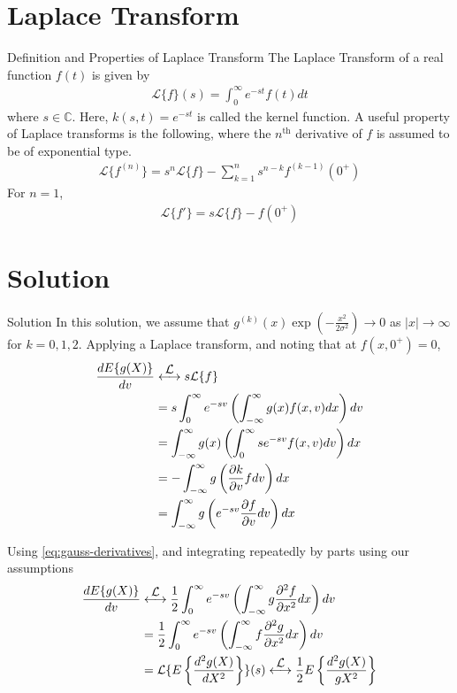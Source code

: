 \documentclass{beamer}
\newcommand\laplace{\ensuremath{\stackrel{\mathclap{\mbox{$\mathcal{L}$}}}{\longleftrightarrow}}}
\begin{document}
\section{Laplace Transform}
\begin{frame}{Definition and Properties of Laplace Transform}
	The Laplace Transform of a real function $f(t)$ is given by
	\begin{align}
		\mathcal{L}\{f\}(s) = \int_{0}^{\infty}e^{-st}f(t)dt  
		\label{eq:lap}
	\end{align}
	where $s \in \mathbb{C}$. Here, $k(s, t) = e^{-st}$ is called the kernel function. A useful property of Laplace transforms is the following, where the $n^{\text{th}}$ derivative of $f$ is assumed to be of exponential type.
	\begin{align}
		\mathcal{L}\{f^{(n)}\} = s^{n}\mathcal{L}\{f\} - \sum_{k = 1}^{n}s^{n - k}f^{(k - 1)}(0^+)
		\label{eq:lap-diff}
	\end{align}
	For $n = 1$,
	\begin{align}
		\mathcal{L}\{f'\} = s\mathcal{L}\{f\} - f(0^+)
		\label{eq:lap-diff-one}
	\end{align}
\end{frame}

\section{Solution}
\begin{frame}{Solution}
	In this solution, we assume that $g^{(k)}(x)\exp{(-\frac{x^2}{2\sigma^2})} \to 0$ as $|x| \to \infty$ for $k = 0, 1, 2$. Applying a Laplace transform, and noting that at $f(x, 0^+) = 0$,
	\begin{align}
		\frac{dE\{g(X)\}}{dv} &\laplace s\mathcal{L}\{f\} \\
		&= s\int_{0}^{\infty}e^{-sv}\left(\int_{-\infty}^{\infty}g(x)f(x, v)dx\right)dv \\
		&= \int_{-\infty}^{\infty}g(x)\left(\int_{0}^{\infty}se^{-sv}f(x, v)dv\right)dx \\
		&= -\int_{-\infty}^{\infty}g\left(\frac{\partial k}{\partial v}fdv\right)dx \\
		&= \int_{-\infty}^{\infty}g\left(e^{-sv}\frac{\partial f}{\partial v}dv\right)dx
		\label{eq:sol1-1}
	\end{align}
\end{frame}

\begin{frame}
	Using \eqref{eq:gauss-derivatives}, and integrating repeatedly by parts using our assumptions
	\begin{align}
		\frac{dE\{g(X)\}}{dv} &\laplace \frac{1}{2}\int_{0}^{\infty}e^{-sv}\left(\int_{-\infty}^{\infty}g\frac{\partial^2 f}{\partial x^2}dx\right)dv \\
		&= \frac{1}{2}\int_{0}^{\infty}e^{-sv}\left(\int_{-\infty}^{\infty}f\frac{\partial^2 g}{\partial x^2}dx\right)dv \\
		&= \mathcal{L}\{E\left\{\frac{d^2g(X)}{dX^2}\right\}\}(s) \laplace \frac{1}{2}E\left\{\frac{d^2g(X)}{gX^2}\right\}
		\label{eq:sol1-2}
	\end{align}
\end{frame}
\end{document}
